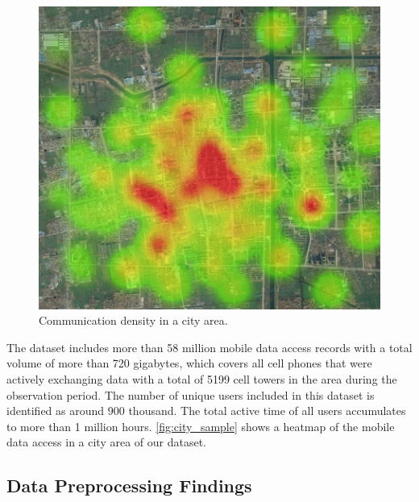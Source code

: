 \begin{figure}[h]
    \centering
    \includegraphics[width=0.8\linewidth]{./figures/hotmap.jpg}
    \caption{Communication density in a city area.}
    \label{fig:city_sample} 
    \vspace{-0.1in}
\end{figure}

The dataset includes more than 58 million mobile data access records with a total volume of more than 720 gigabytes, which covers all cell phones that were actively exchanging data with a total of 5199 cell towers in the area during the observation period. 
The number of unique users included in this dataset is identified as around 900 thousand. %
The total active time of all users accumulates to more than 1 million hours. 
\autoref{fig:city_sample} shows a heatmap of the mobile data access in a city area of our dataset.

\subsection{Data Preprocessing Findings}

